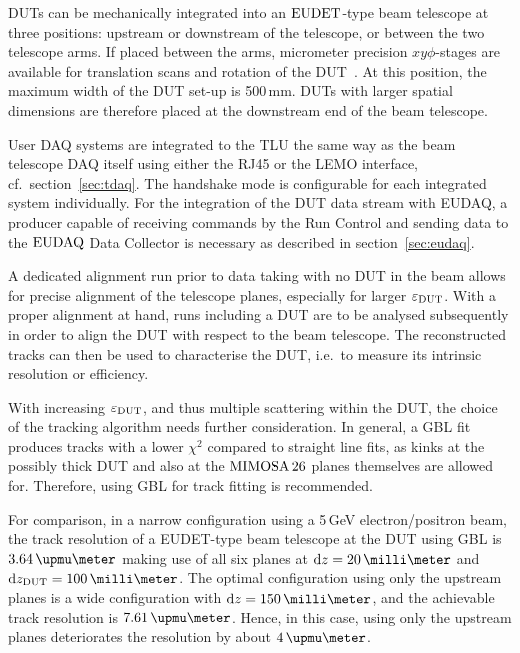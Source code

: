 DUTs can be mechanically integrated into an $\textrm{EUDET}$-type beam telescope at three positions: upstream or downstream of the telescope, or between the two telescope arms.
If placed between the arms, micrometer precision $xy\phi$-stages are available for translation scans and rotation of the DUT~\cite{Mimosa-twiki}.
At this position, the maximum width of the DUT set-up is 500\,mm.
DUTs with larger spatial dimensions are therefore placed at the downstream end of the beam telescope. 

User DAQ systems are integrated to the TLU the same way as the beam telescope DAQ itself using either the RJ45 or the LEMO interface, cf.~section~\ref{sec:tdaq}.
The handshake mode is configurable for each integrated system individually. 
For the integration of the DUT data stream with EUDAQ, a producer capable of receiving commands by the Run Control and sending data to the $\textrm{EUDAQ}$ Data Collector is necessary
 as described in section~\ref{sec:eudaq}.

A dedicated alignment run prior to data taking with no DUT in the beam allows for precise alignment of the telescope planes, especially for larger $\mathnormal{\varepsilon_{\textrm{DUT}}}$. 
With a proper alignment at hand, runs including a DUT are to be analysed subsequently in order to align the DUT with respect to the beam telescope. 
The reconstructed tracks can then be used to characterise the DUT, i.e.~to measure its intrinsic resolution or efficiency. 

With increasing $\mathnormal{\varepsilon_{\textrm{DUT}}}$, and thus multiple scattering within the DUT, the choice of the tracking algorithm needs further consideration. 
In general, a GBL fit produces tracks with a lower $\chi^2$ compared to straight line fits,
 as kinks at the possibly thick DUT and also at the $\textrm{MIMOSA\,26}$ planes themselves are allowed for.
Therefore, using GBL for track fitting is recommended. 

For comparison, in a narrow configuration using a 5\,GeV electron/positron beam,
 the track resolution of a EUDET-type beam telescope at the DUT using GBL is $3.64\,\upmu\meter$ making use of all six planes at $\dz = 20\,\milli\meter$ and $\dzdut = 100\,\milli\meter$.
The optimal configuration using only the upstream planes is a wide configuration with $\dz = 150\,\milli\meter$,
 and the achievable track resolution is $7.61\,\upmu\meter$. 
Hence, in this case, using only the upstream planes deteriorates the resolution by about $4\,\upmu\meter$.
